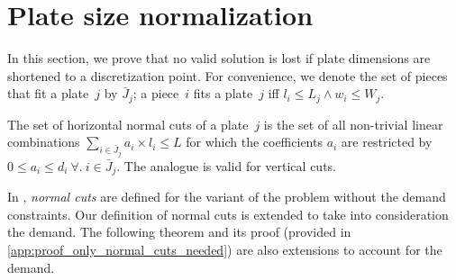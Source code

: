 \documentclass[smallextended]{svjour3}       %
\begin{document}




\section{Plate size normalization}

In this section, we prove that no valid solution is lost if plate dimensions are shortened to a discretization point.
For convenience, we denote the set of pieces that fit a plate~\(j\) by \(\bar{J}_j\); a piece~\(i\) fits a plate~\(j\) iff \(l_i \leq L_j \land w_i \leq W_j\).%


\begin{definition}
The set of horizontal normal cuts of a plate~\(j\) is the set of all non-trivial linear combinations \(\sum_{i \in \bar{J}_j} a_i \times l_i \leq L\) for which the coefficients \(a_i\) are restricted by \(0 \leq a_i \leq d_i~\forall.~i \in \bar{J}_j\). The analogue is valid for vertical cuts.
\end{definition}

In \cite{nicos:1977}, \emph{normal cuts} are defined for the variant of the problem without the demand constraints.
Our definition of normal cuts is extended to take into consideration the demand.
The following theorem and its proof (provided in \autoref{app:proof_only_normal_cuts_needed}) are also extensions to account for the demand.
\end{document}
